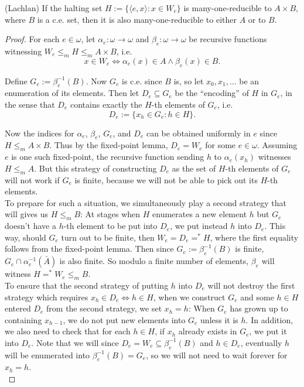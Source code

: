 \begin{theorem}
  (Lachlan) If the halting set $H:=\{\langle e,x\rangle: x\in W_e\}$ is
  many-one-reducible to $A\times B$, where $B$ is a c.e. set, then it is
  also many-one-reducible to either $A$ or to $B$.
\end{theorem}
\begin{proof}
  For each $e\in\omega$, let $\alpha_e:\omega \rightarrow\omega$ and
  $\beta_e:\omega \rightarrow\omega$ be recursive functions witnessing
  $W_e\leq_m H\leq_m A\times B$, i.e.
  \[x\in W_e \Leftrightarrow \alpha_e(x)\in A \wedge \beta_e(x)\in B.\]

  Define $G_e:=\beta_e^{-1}(B)$. Now $G_e$ is c.e. since $B$ is, so let
  $x_0,x_1,\ldots$ be an enumeration of its elements. Then let
  $D_e\subseteq G_e$ be the ``encoding'' of $H$ in $G_e$, in the sense that
  $D_e$ contains exactly the $H$-th elements of $G_e$, i.e.
  \[D_e :=\{x_h\in G_e: h\in H\}.\]

  Now the indices for $\alpha_e$, $\beta_e$, $G_e$, and $D_e$ can be
  obtained uniformly in $e$ since $H\leq_m A\times B$. Thus by the
  fixed-point lemma, $D_e=W_e$ for some $e\in\omega$. Assuming $e$ is one
  such fixed-point, the recursive function sending $h$ to $\alpha_e(x_h)$
  witnesses $H\leq_m A$. But this strategy of constructing $D_e$ as the set
  of $H$-th elements of $G_e$ will not work if $G_e$ is finite, because we
  will not be able to pick out its $H$-th elements.\\

  To prepare for such a situation, we simultaneously play a second strategy
  that will gives us $H\leq_m B$: At stages when $H$ enumerates a new
  element $h$ but $G_e$ doesn't have a $h$-th element to be put into
  $D_e$, we put instead $h$ into $D_e$. This way, should $G_e$ turn out to
  be finite, then $W_e=D_e=^*H$, where the first equality follows from the
  fixed-point lemma. Then since $G_e:=\beta_e^{-1}(B)$ is finite,
  $G_e\cap \alpha_e^{-1}(\bar{A})$ is also finite. So modulo a finite
  number of elements, $\beta_e$ will witness $H=^*W_e\leq_m B$.\\

  To ensure that the second strategy of putting $h$ into $D_e$ will not
  destroy the first strategy which requires $x_h\in D_e \Leftrightarrow
  h\in H$, when we construct $G_e$ and some $h\in H$ entered $D_e$ from
  the second strategy, we set $x_h=h$: When $G_e$ has grown up to
  containing $x_{h-1}$, we do not put new elements into $G_e$ unless it is
  $h$. In addition, we also need to check that for each $h\in H$, if $x_h$
  already exists in $G_e$, we put it into $D_e$. Note that we will since
  $D_e=W_e\subseteq\beta_e^{-1}(B)$ and $h\in D_e$, eventually $h$ will be
  enumerated into $\beta_e^{-1}(B)=G_e$, so we will not need to wait
  forever for $x_h=h$. \\


\end{proof}

